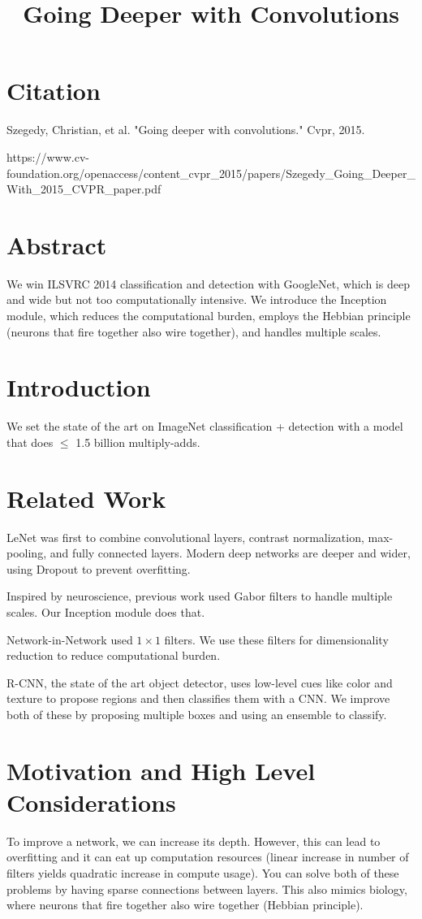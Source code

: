 \documentclass[a4paper]{article}
\title{Going Deeper with Convolutions}
\date{}
\begin{document}
\maketitle

\section{Citation}
Szegedy, Christian, et al. "Going deeper with convolutions." Cvpr, 2015.

https://www.cv-foundation.org/openaccess/content_cvpr_2015/papers/Szegedy_Going_Deeper_With_2015_CVPR_paper.pdf

\section{Abstract}
We win ILSVRC 2014 classification and detection with GoogleNet, which is deep
and wide but not too computationally intensive. We introduce the Inception
module, which reduces the computational burden, employs the Hebbian principle
(neurons that fire together also wire together), and handles multiple scales.

\section{Introduction}
We set the state of the art on ImageNet classification + detection with a model
that does $\leq$ 1.5 billion multiply-adds.

\section{Related Work}
LeNet was first to combine convolutional layers, contrast normalization,
max-pooling, and fully connected layers. Modern deep networks are deeper and
wider, using Dropout to prevent overfitting.

Inspired by neuroscience, previous work used Gabor filters to handle multiple
scales. Our Inception module does that.

Network-in-Network used $1 \times 1$ filters. We use these filters for 
dimensionality reduction to reduce computational burden.

R-CNN, the state of the art object detector, uses low-level cues like color and
texture to propose regions and then classifies them with a CNN. We improve both
of these by proposing multiple boxes and using an ensemble to classify.

\section{Motivation and High Level Considerations}
To improve a network, we can increase its depth. However, this can lead to
overfitting and it can eat up computation resources (linear increase in number
of filters yields quadratic increase in compute usage). You can solve both of
these problems by having sparse connections between layers. This also mimics
biology, where neurons that fire together also wire together (Hebbian
principle).
\end{document}

